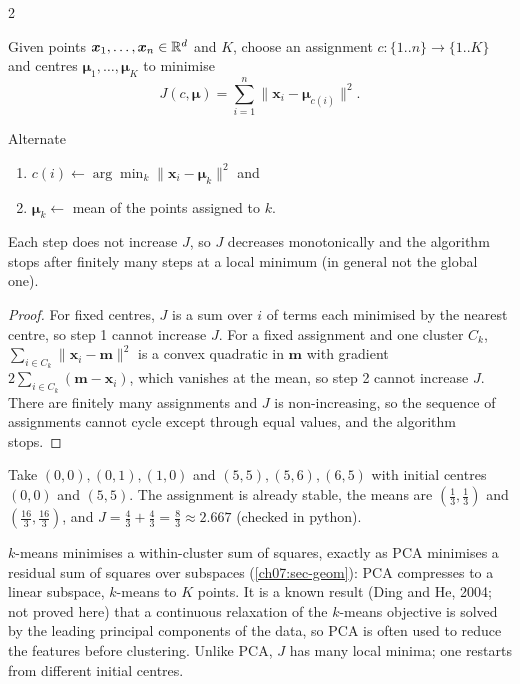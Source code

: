 \begin{paracol}{2}
\begin{definition}[$k$-means]\label{ch16:def-kmeans}
Given points $\bm x_1,\dots,\bm x_n\in\mathbb{R}^d$ and $K$, choose an assignment $c:\{1..n\}\to\{1..K\}$ and centres
$\bm\mu_1,\dots,\bm\mu_K$ to minimise
\[
  J(c,\bm\mu)=\sum_{i=1}^n\|\bm x_i-\bm\mu_{c(i)}\|^2 .
\]
\end{definition}
\begin{proposition}\label{ch16:prop-lloyd}
Alternate
\begin{enumerate}[1.]
  \item $c(i)\leftarrow\arg\min_k\|\bm x_i-\bm\mu_k\|^2$ and
  \item $\bm\mu_k\leftarrow$ mean of the points assigned to $k$.
\end{enumerate}
Each step does not increase $J$, so $J$ decreases monotonically and the algorithm stops after finitely many steps at a local
minimum (in general not the global one).
\end{proposition}
\begin{proof}
For fixed centres, $J$ is a sum over $i$ of terms each minimised by the nearest centre, so step 1 cannot increase $J$.
For a fixed assignment and one cluster $C_k$, $\sum_{i\in C_k}\|\bm x_i-\bm m\|^2$ is a convex quadratic in $\bm m$ with
gradient $2\sum_{i\in C_k}(\bm m-\bm x_i)$, which vanishes at the mean, so step 2 cannot increase $J$.
There are finitely many assignments and $J$ is non-increasing, so the sequence of assignments cannot cycle except through
equal values, and the algorithm stops.
\end{proof}
\begin{example}\label{ch16:ex-kmeans}
Take $(0,0),(0,1),(1,0)$ and $(5,5),(5,6),(6,5)$ with initial centres $(0,0)$ and $(5,5)$. The assignment is already
stable, the means are $(\tfrac13,\tfrac13)$ and $(\tfrac{16}3,\tfrac{16}3)$, and $J=\tfrac43+\tfrac43=\tfrac83\approx2.667$ (checked in python).
\end{example}
\begin{intuition}
$k$-means minimises a within-cluster sum of squares, exactly as PCA minimises a residual sum of squares over subspaces
(\cref{ch07:sec-geom}): PCA compresses to a linear subspace, $k$-means to $K$ points. It is a known result (Ding and He, 2004; not
proved here) that a continuous relaxation of the $k$-means objective is solved by the leading principal components of the data,
so PCA is often used to reduce the features before clustering. Unlike PCA, $J$ has many local minima; one restarts from different
initial centres.
\end{intuition}


\end{paracol}
